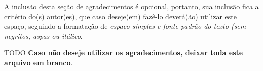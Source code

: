 \begin{agradecimentos}
A inclusão desta seção de agradecimentos é opcional, portanto, sua inclusão
fica a critério do(s) autor(es), que caso deseje(em) fazê-lo deverá(ão)
utilizar este espaço, seguindo a formatação de \textit{espaço simples e
fonte padrão do texto (sem negritos, aspas ou itálico}.

TODO
\textbf{Caso não deseje utilizar os agradecimentos, deixar toda este arquivo
em branco}.
\end{agradecimentos}
